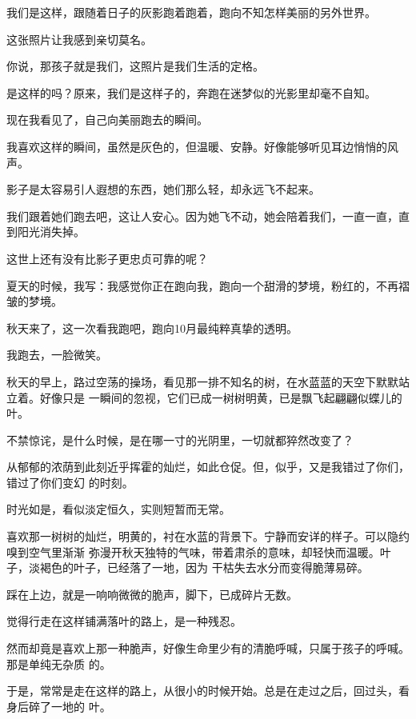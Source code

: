 \documentclass[12pt,a4paper]{article}
\begin{document}
	\endwriting



		我们是这样，跟随着日子的灰影跑着跑着，跑向不知怎样美丽的另外世界。

		这张照片让我感到亲切莫名。

		你说，那孩子就是我们，这照片是我们生活的定格。

		是这样的吗？原来，我们是这样子的，奔跑在迷梦似的光影里却毫不自知。

		现在我看见了，自己向美丽跑去的瞬间。

		我喜欢这样的瞬间，虽然是灰色的，但温暖、安静。好像能够听见耳边悄悄的风声。

		影子是太容易引人遐想的东西，她们那么轻，却永远飞不起来。

		我们跟着她们跑去吧，这让人安心。因为她飞不动，她会陪着我们，一直一直，直到阳光消失掉。

		这世上还有没有比影子更忠贞可靠的呢？

		夏天的时候，我写：我感觉你正在跑向我，跑向一个甜滑的梦境，粉红的，不再褶皱的梦境。

		秋天来了，这一次看我跑吧，跑向10月最纯粹真挚的透明。

		我跑去，一脸微笑。

	\endwriting


		秋天的早上，路过空荡的操场，看见那一排不知名的树，在水蓝蓝的天空下默默站立着。好像只是
	一瞬间的忽视，它们已成一树树明黄，已是飘飞起翩翩似蝶儿的叶。

		不禁惊诧，是什么时候，是在哪一寸的光阴里，一切就都猝然改变了？

		从郁郁的浓荫到此刻近乎挥霍的灿烂，如此仓促。但，似乎，又是我错过了你们，错过了你们变幻
	的时刻。

		时光如是，看似淡定恒久，实则短暂而无常。

		喜欢那一树树的灿烂，明黄的，衬在水蓝的背景下。宁静而安详的样子。可以隐约嗅到空气里渐渐
	弥漫开秋天独特的气味，带着肃杀的意味，却轻快而温暖。叶子，淡褐色的叶子，已经落了一地，因为
	干枯失去水分而变得脆薄易碎。

		踩在上边，就是一响响微微的脆声，脚下，已成碎片无数。

		觉得行走在这样铺满落叶的路上，是一种残忍。

		然而却竟是喜欢上那一种脆声，好像生命里少有的清脆呼喊，只属于孩子的呼喊。那是单纯无杂质
	的。

		于是，常常是走在这样的路上，从很小的时候开始。总是在走过之后，回过头，看身后碎了一地的
	叶。
\end{document}
